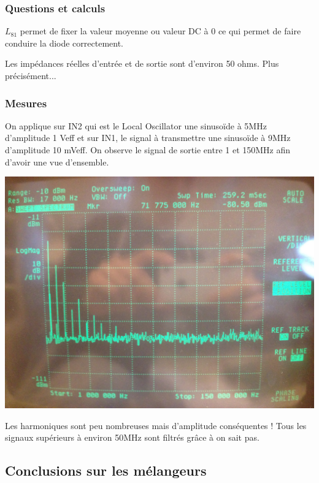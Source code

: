 \documentclass{article}
\begin{document}
%
%

\subsubsection{Questions et calculs}


$L_{81}$ permet de fixer la valeur moyenne ou valeur DC à 0 ce qui permet de faire conduire la diode correctement.


Les impédances réelles d'entrée et de sortie sont d'environ 50 ohms. Plus précisément...




\subsubsection{Mesures}


On applique sur IN2 qui est le Local Oscillator une sinusoïde à 5MHz d'amplitude  1 Veff  et sur IN1, le signal à transmettre une sinusoïde à 9MHz d'amplitude 10 mVeff.
On observe le signal de sortie entre 1 et 150MHz afin d'avoir une vue d'ensemble.
\begin{center}
\includegraphics[width=0.7\linewidth]{11_3_1.jpg}
\end{center}
Les harmoniques sont peu nombreuses mais d'amplitude conséquentes ! Tous les signaux supérieurs à environ 50MHz sont filtrés grâce à on sait pas.






\subsection{Conclusions sur les mélangeurs}
\end{document}
